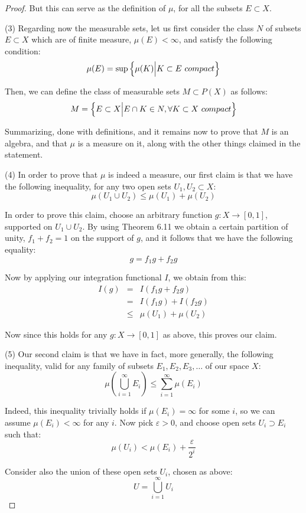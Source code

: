 \documentclass[10pt,a4paper]{amsart}
\begin{document}
\begin{proof}
But this can serve as the definition of $\mu$, for all the subsets $E\subset X$.

\medskip

(3) Regarding now the measurable sets, let us first consider the class $N$ of subsets $E\subset X$ which are of finite measure, $\mu(E)<\infty$, and satisfy the following condition:
$$\mu(E)=\sup\left\{\mu(K)\Big| K\subset E\ {\rm compact}\right\}$$

Then, we can define the class of measurable sets $M\subset P(X)$ as follows:
$$M=\left\{E\subset X\Big|E\cap K\in N,\forall K\subset X\ {\rm compact}\right\}$$

Summarizing, done with definitions, and it remains now to prove that $M$ is an algebra, and that $\mu$ is a measure on it, along with the other things claimed in the statement.

\medskip

(4) In order to prove that $\mu$ is indeed a measure, our first claim is that we have the following inequality, for any two open sets $U_1,U_2\subset X$:
$$\mu(U_1\cup U_2)\leq\mu(U_1)+\mu(U_2)$$ 

In order to prove this claim, choose an arbitrary function $g:X\to[0,1]$, supported on $U_1\cup U_2$. By using Theorem 6.11 we obtain a certain partition of unity, $f_1+f_2=1$ on the support of $g$, and it follows that we have the following equality:
$$g=f_1g+f_2g$$

Now by applying our integration functional $I$, we obtain from this:
\begin{eqnarray*}
I(g)
&=&I(f_1g+f_2g)\\
&=&I(f_1g)+I(f_2g)\\
&\leq&\mu(U_1)+\mu(U_2)
\end{eqnarray*}

Now since this holds for any $g:X\to[0,1]$ as above, this proves our claim.

\medskip

(5) Our second claim is that we have in fact, more generally, the following inequality, valid for any family of subsets $E_1,E_2,E_3,\ldots$ of our space $X$:
$$\mu\left(\bigcup_{i=1}^\infty E_i\right)\leq\sum_{i=1}^\infty\mu(E_i)$$

Indeed, this inequality trivially holds if $\mu(E_i)=\infty$ for some $i$, so we can assume $\mu(E_i)<\infty$ for any $i$. Now pick $\varepsilon>0$, and choose open sets $U_i\supset E_i$ such that:
$$\mu(U_i)<\mu(E_i)+\frac{\varepsilon}{2^i}$$

Consider also the union of these open sets $U_i$, chosen as above:
$$U=\bigcup_{i=1}^\infty U_i$$


\end{proof}
\end{document}
